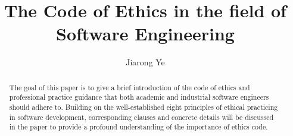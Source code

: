 \documentclass[sigconf]{acmart}
\begin{document}
\title{The Code of Ethics in the field of Software Engineering}


\author{Jiarong Ye}




\begin{abstract}
	The goal of this paper is to give a brief introduction of the code of ethics and professional practice guidance that both academic and industrial software engineers should adhere to. Building on the well-established eight principles of ethical practicing in software development, corresponding clauses  and concrete details will be discussed in the paper to provide a profound understanding of the importance of ethics code.
\end{abstract}


%






\maketitle





\end{document}
